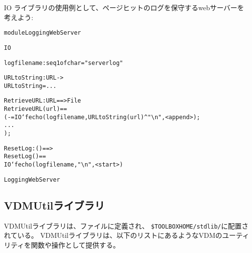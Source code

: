 \documentclass[\pformat,12pt]{jarticle}
\begin{document}
IO ライブラリの使用例として、ページヒットのログを保守するwebサーバーを考えよう:

\begin{alltt}
  module LoggingWebServer

       IO 

     


      logfilename : seq1 of char = "serverlog"

      URLtoString : URL ->   
      URLtoString = ...

      RetrieveURL : URL ==> File
      RetrieveURL(url) ==
        ( - = IO`fecho(logfilename, URLtoString(url)^\verb+"\n"+, <append>);
         ... 
        );

      ResetLog : () ==> 
      ResetLog() ==
        IO`fecho(logfilename,\verb+"\n"+,<start>)

   LoggingWebServer
\end{alltt}

\subsection{VDMUtilライブラリ}

VDMUtilライブラリは、ファイルに定義され、
\verb+$TOOLBOXHOME/stdlib/+に配置されている。
VDMUtilライブラリは、以下のリストにあるようなVDMのユーティリティを関数や操作として提供する。
\end{document}
